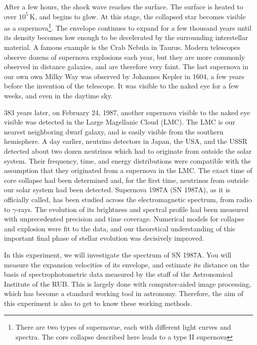 \documentclass{article}
\begin{document}
After a few hours, the shock wave reaches the surface.
The surface is heated to over $10^5$\,K, and begins to glow.
At this stage, the collapsed star becomes visible as a supernova\footnote{There are two types of supernovae, each with different light curves and spectra. The core collapse described here leads to a type II supernova}.
The envelope continues to expand for a few thousand years until its density becomes low enough to be decelerated by the surrounding interstellar material.
A famous example is the Crab Nebula in Taurus.
Modern telescopes observe dozens of supernova explosions each year, but they are more commonly observed in distance galaxies, and are therefore very faint.
The last supernova in our own own Milky Way was observed by Johannes Kepler in 1604, a few years before the invention of the telescope. 
It was visible to the naked eye for a few weeks, and even in the daytime sky.

383 years later, on February 24, 1987, another supernova visible to the naked eye visible was detected in the Large Magellanic Cloud (LMC).
The LMC is our nearest neighboring dwarf galaxy, and is easily visible from the southern hemisphere.
A day earlier, neutrino detectors in Japan, the USA, and the USSR detected about two dozen neutrinos which had to originate from outside the solar system.
Their frequency, time, and energy distributions were compatible with the assumption that they originated from a supernova in the LMC.
The exact time of core collapse had been determined and, for the first time, neutrinos from outside our solar system had been detected.
Supernova 1987A (SN 1987A), as it is officially called, has been studied across the electromagnetic spectrum, from radio to $\gamma$-rays.
The evolution of its brightness and spectral profile had been measured with unprecedented precision and time coverage.
Numerical models for collapse and explosion were fit to the data, and our theoretical understanding of this important final phase of stellar evolution was decisively improved.

In this experiment, we will investigate the spectrum of SN 1987A.
You will measure the expansion velocities of its envelope, and estimate its distance on the basis of spectrophotometric data measured by the staff of the Astronomical Institute of the RUB.
This is largely done with computer-aided image processing, which has become a standard working tool in astronomy.
Therefore, the aim of this experiment is also to get to know these working methods.
\end{document}
